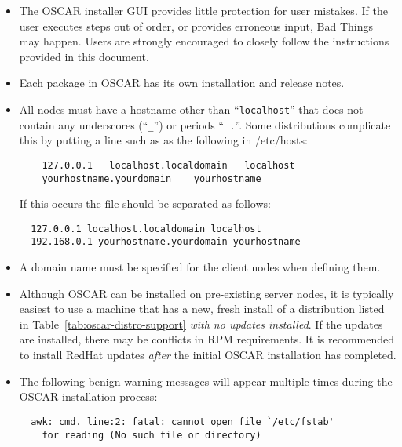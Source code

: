 \begin{itemize}

\item The OSCAR installer GUI provides little protection for user
  mistakes.  If the user executes steps out of order, or provides
  erroneous input, Bad Things may happen.  Users are strongly
  encouraged to closely follow the instructions provided in this
  document.

\item Each package in OSCAR has its own installation and release
  notes.   

\begchange
\item All nodes must have a hostname other than ``{\tt localhost}''
  that does not contain any underscores (``{\tt \_}'') or periods ``{\tt
  .}''.  Some distributions complicate this by putting a line such
  as as the following in /etc/hosts:
  \begin{verbatim}
    127.0.0.1   localhost.localdomain   localhost
    yourhostname.yourdomain    yourhostname
  \end{verbatim}
  If this occurs the file should be separated as follows:
  \begin{verbatim}
  127.0.0.1 localhost.localdomain localhost
  192.168.0.1 yourhostname.yourdomain yourhostname
  \end{verbatim}
\endchange

\item A domain name must be specified for the client nodes when
  defining them.

\item Although OSCAR can be installed on pre-existing server nodes, it
  is typically easiest to use a machine that has a new, fresh install
  of a distribution listed in Table~\ref{tab:oscar-distro-support}
  {\em with no updates installed}.  If the updates are installed,
  there may be conflicts in RPM requirements.  It is recommended to
  install RedHat updates {\em after} the initial OSCAR installation has
  completed.

\item The following benign warning messages will appear multiple times
  during the OSCAR installation process:

\begin{verbatim}
  awk: cmd. line:2: fatal: cannot open file `/etc/fstab'
    for reading (No such file or directory)


\end{verbatim}
\end{itemize}
